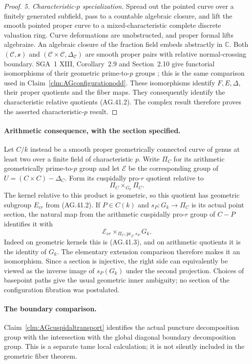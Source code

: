 \begin{proof}
\emph{5. Characteristic-\(p\) specialization.}
Spread out the pointed curve over a finitely generated
subfield, pass to a countable algebraic closure, and lift
the smooth pointed proper curve to a mixed-characteristic
complete discrete valuation ring. Curve deformations are
unobstructed, and proper formal lifts algebraize. An
algebraic closure of the fraction field embeds abstractly
in \(\mathbb C\). Both
\((\mathcal C,\mathcal x)\) and
\((\mathcal C\times\mathcal C,\Delta_{\mathcal C})\)
are smooth proper pairs with relative normal-crossing
boundary. SGA~1 XIII, Corollary~2.9 and Section~2.10 give
functorial isomorphisms of their geometric prime-to-\(p\)
groups \cite{AR_SGA1}; this is the same comparison used
in Claim~\ref{clm:AGconfigurationodd}.
These isomorphisms identify \(F,E,\Delta\), their proper
quotients and the fiber maps. They consequently identify
the characteristic relative quotients (AG.41.2).
The complex result therefore proves the asserted
characteristic-\(p\) result.
\end{proof}

\paragraph{Arithmetic consequence, with the section specified.}
Let \(C/k\) instead be a smooth proper geometrically
connected curve of genus at least two over a finite field
of characteristic \(p\). Write \(\Pi_C\) for its
arithmetic geometrically prime-to-\(p\) group and let
\(\mathcal E\) be the corresponding group of
\(U=(C\times C)-\Delta_C\). Form its cuspidally
pro-\(r\) quotient relative to
\[
                \Pi_C\times_{G_k}\Pi_C.
                                                        \tag{AG.41.13}
\]
The kernel relative to this product is geometric, so this
quotient has geometric subgroup \(E_{\mathrm{c}r}\)
from (AG.41.2). If \(P\in C(k)\) and
\(s_P:G_k\to\Pi_C\) is its actual point section,
the natural map from the arithmetic cuspidally pro-\(r\)
group of \(C-P\) identifies it with
\[
       \mathcal E_{\mathrm{c}r}
                  \times_{\Pi_C,\mathrm{pr}_2,s_P}G_k.
                                                        \tag{AG.41.14}
\]
Indeed on geometric kernels this is (AG.41.3), and on
arithmetic quotients it is the identity of \(G_k\).
The elementary extension comparison therefore makes it
an isomorphism. Since a section is injective, the right
side can equivalently be viewed as the inverse image of
\(s_P(G_k)\) under the second projection. Choices of
basepoint paths give the usual geometric inner ambiguity;
no section of the configuration fibration was postulated.

\paragraph{The boundary comparison.}
Claim~\ref{clm:AGcuspidaltransport} identifies the actual
puncture decomposition group with the intersection with
the global diagonal boundary decomposition group. This
is a separate tame local calculation; it is not silently
included in the geometric fiber theorem.
